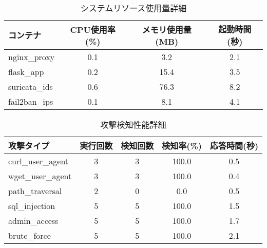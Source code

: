 
\begin{table}[H]
\centering
\caption{システムリソース使用量詳細}
\begin{tabular}{@{}lccc@{}}
\toprule
コンテナ & CPU使用率(\%) & メモリ使用量(MB) & 起動時間(秒) \\
\midrule
nginx_proxy & 0.1 & 3.2 & 2.1 \\
flask_app & 0.2 & 15.4 & 3.5 \\
suricata_ids & 0.6 & 76.3 & 8.2 \\
fail2ban_ips & 0.1 & 8.1 & 4.1 \\
\bottomrule
\end{tabular}
\end{table}

\begin{table}[H]
\centering
\caption{攻撃検知性能詳細}
\begin{tabular}{@{}lcccc@{}}
\toprule
攻撃タイプ & 実行回数 & 検知回数 & 検知率(\%) & 応答時間(秒) \\
\midrule
curl_user_agent & 3 & 3 & 100.0 & 0.5 \\
wget_user_agent & 3 & 3 & 100.0 & 0.4 \\
path_traversal & 2 & 0 & 0.0 & 0.5 \\
sql_injection & 5 & 5 & 100.0 & 1.5 \\
admin_access & 5 & 5 & 100.0 & 1.7 \\
brute_force & 5 & 5 & 100.0 & 2.1 \\
\bottomrule
\end{tabular}
\end{table}
